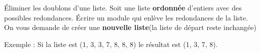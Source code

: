 \begin{Exercice}{Éliminer les doublons d'une liste.}
	Soit une liste \textbf{ordonnée}
	d'entiers avec des possibles redondances. Écrire un
	module qui enlève les redondances de la liste. On vous demande de créer
	une \textbf{nouvelle liste}(la liste de départ reste inchangée)

	Exemple : Si la liste est (1, 3, 3, 7, 8, 8, 8) le résultat est (1, 3, 7, 8).
\end{Exercice}
